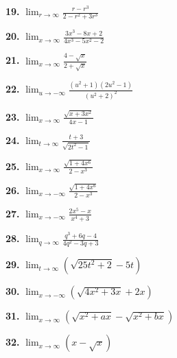 \begin{minipage}[t]{0.485\textwidth}
\vspace{0.5em}

\noindent
\parbox[t]{0.48\linewidth}{\textbf{19.} $\displaystyle \lim_{r \to \infty} \frac{r - r^3}{2 - r^2 + 3r^3}$}\hfill
\parbox[t]{0.48\linewidth}{\textbf{20.} $\displaystyle \lim_{x \to \infty} \frac{3x^3 - 8x + 2}{4x^3 - 5x^2 - 2}$}

\vspace{0.5em}

\noindent
\parbox[t]{0.48\linewidth}{\textbf{21.} $\displaystyle \lim_{x \to \infty} \frac{4 - \sqrt{x}}{2 + \sqrt{x}}$}\hfill
\parbox[t]{0.48\linewidth}{\textbf{22.} $\displaystyle \lim_{u \to -\infty} \frac{(u^2 + 1)(2u^2 - 1)}{(u^2 + 2)^2}$}

\vspace{0.5em}

\noindent
\parbox[t]{0.48\linewidth}{\textbf{23.} $\displaystyle \lim_{x \to \infty} \frac{\sqrt{x + 3x^2}}{4x - 1}$}\hfill
\parbox[t]{0.48\linewidth}{\textbf{24.} $\displaystyle \lim_{t \to \infty} \frac{t + 3}{\sqrt{2t^2 - 1}}$}

\vspace{0.5em}

\noindent
\parbox[t]{0.48\linewidth}{\textbf{25.} $\displaystyle \lim_{x \to \infty} \frac{\sqrt{1 + 4x^6}}{2 - x^3}$}\hfill
\parbox[t]{0.48\linewidth}{\textbf{26.} $\displaystyle \lim_{x \to -\infty} \frac{\sqrt{1 + 4x^6}}{2 - x^3}$}

\vspace{0.5em}

\noindent
\parbox[t]{0.48\linewidth}{\textbf{27.} $\displaystyle \lim_{x \to -\infty} \frac{2x^5 - x}{x^4 + 3}$}\hfill
\parbox[t]{0.48\linewidth}{\textbf{28.} $\displaystyle \lim_{q \to \infty} \frac{q^3 + 6q - 4}{4q^2 - 3q + 3}$}

\vspace{0.5em}

\noindent
\parbox[t]{0.47\linewidth}{\textbf{29.} $\displaystyle \lim_{t \to \infty} \left(\sqrt{25t^2 + 2} - 5t\right)$}\hfill
\parbox[t]{0.51\linewidth}{\textbf{30.} $\displaystyle \lim_{x \to -\infty} \left(\sqrt{4x^2 + 3x} + 2x\right)$}

\vspace{0.5em}

\noindent
\textbf{31.} $\displaystyle \lim_{x \to \infty} \left(\sqrt{x^2 + ax} - \sqrt{x^2 + bx}\right)$

\vspace{0.5em}

\noindent
\textbf{32.} $\displaystyle \lim_{x \to \infty} \left(x - \sqrt{x}\right)$


\end{minipage}
